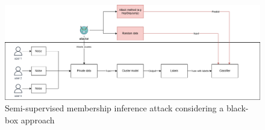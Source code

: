 


\begin{figure}
  \label{fig:unsupervised-mia-attack}
  \includegraphics[width=1.0\textwidth]{TheorethicalFramework/Differential privacy/master-thesis-MIA.png}
  \caption{Semi-supervised membership inference attack considering a black-box approach \citep{chen_hopskipjumpattack_2020,li_membership_2021}}
\end{figure}
